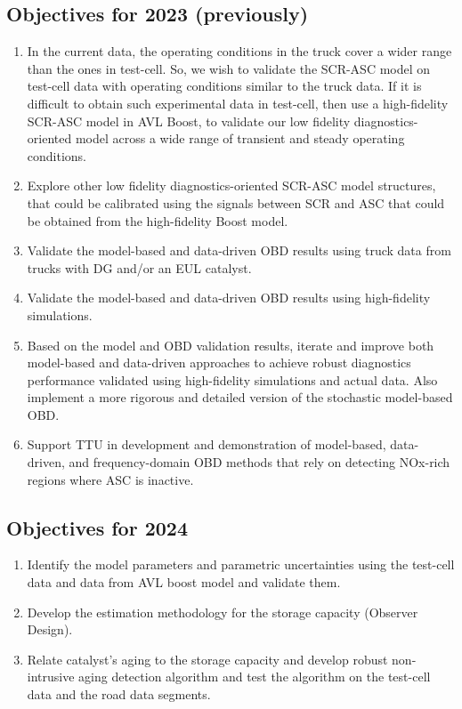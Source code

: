 \subsection{Objectives for 2023 (previously)}
\begin{enumerate}
 \item In the current data, the operating conditions in the truck cover a wider range than the ones in test-cell. So, we wish to validate the SCR-ASC model on test-cell data with operating conditions similar to the truck data. If it is difficult to obtain such experimental data in test-cell, then use a high-fidelity SCR-ASC model in AVL Boost, to validate our low fidelity diagnostics-oriented model across a wide range of transient and steady operating conditions.
 \item Explore other low fidelity diagnostics-oriented SCR-ASC model structures, that could be calibrated using the signals between SCR and ASC that could be obtained from the high-fidelity Boost model.
 \item Validate the model-based and data-driven OBD results using truck data from trucks with DG and/or an EUL catalyst.
 \item Validate the model-based and data-driven OBD results using high-fidelity simulations.
 \item Based on the model and OBD validation results, iterate and improve both model-based and data-driven approaches to achieve robust diagnostics performance validated using high-fidelity simulations and actual data. Also implement a more rigorous and detailed version of the stochastic model-based OBD.
 \item Support TTU in development and demonstration of model-based, data-driven, and frequency-domain OBD methods that rely on detecting NOx-rich regions where ASC is inactive.
\end{enumerate}


\subsection{Objectives for 2024}
\begin{enumerate}
\item Identify the model parameters and parametric uncertainties using
the test-cell data and data from AVL boost model and validate them.
\item Develop the estimation methodology for the storage capacity (Observer Design).
\item Relate catalyst's aging to the storage capacity and develop robust
non-intrusive aging detection algorithm and test the algorithm on the test-cell
data and the road data segments.
\end{enumerate}
